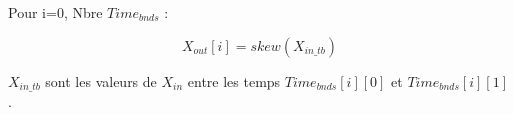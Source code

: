 Pour  i=$0$, Nbre $Time_{bnds}$ :

\[
X_{out}[i] = skew(\displaystyle{X_{in\_tb}})
\]

$X_{in\_tb}$ sont les valeurs de $X_{in}$ entre les temps $Time_{bnds}[i][0]$ et $Time_{bnds}[i][1]$.

